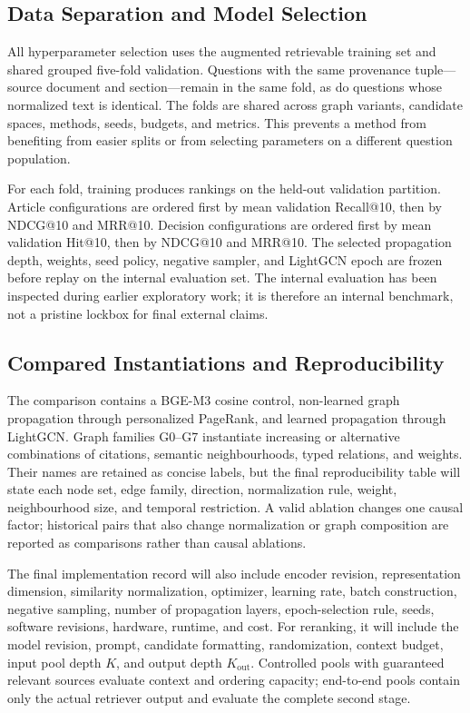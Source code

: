 \documentclass[runningheads]{llncs}
\begin{document}
\subsection{Data Separation and Model Selection}

All hyperparameter selection uses the augmented retrievable training set and shared grouped five-fold validation. Questions with the same provenance tuple---source document and section---remain in the same fold, as do questions whose normalized text is identical. The folds are shared across graph variants, candidate spaces, methods, seeds, budgets, and metrics. This prevents a method from benefiting from easier splits or from selecting parameters on a different question population.

For each fold, training produces rankings on the held-out validation partition. Article configurations are ordered first by mean validation Recall@10, then by NDCG@10 and MRR@10. Decision configurations are ordered first by mean validation Hit@10, then by NDCG@10 and MRR@10. The selected propagation depth, weights, seed policy, negative sampler, and LightGCN epoch are frozen before replay on the internal evaluation set. The internal evaluation has been inspected during earlier exploratory work; it is therefore an internal benchmark, not a pristine lockbox for final external claims.

\subsection{Compared Instantiations and Reproducibility}

The comparison contains a BGE-M3 cosine control, non-learned graph propagation through personalized PageRank, and learned propagation through LightGCN. Graph families G0--G7 instantiate increasing or alternative combinations of citations, semantic neighbourhoods, typed relations, and weights. Their names are retained as concise labels, but the final reproducibility table will state each node set, edge family, direction, normalization rule, weight, neighbourhood size, and temporal restriction. A valid ablation changes one causal factor; historical pairs that also change normalization or graph composition are reported as comparisons rather than causal ablations.

The final implementation record will also include encoder revision, representation dimension, similarity normalization, optimizer, learning rate, batch construction, negative sampling, number of propagation layers, epoch-selection rule, seeds, software revisions, hardware, runtime, and cost. For reranking, it will include the model revision, prompt, candidate formatting, randomization, context budget, input pool depth \(K\), and output depth \(K_{\mathrm{out}}\). Controlled pools with guaranteed relevant sources evaluate context and ordering capacity; end-to-end pools contain only the actual retriever output and evaluate the complete second stage.
\end{document}
